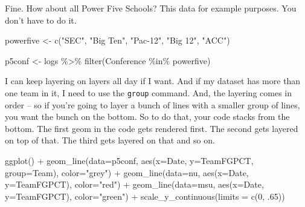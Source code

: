 \documentclass[
]{book}
\newenvironment{Shaded}{\begin{snugshade}}{\end{snugshade}}
\newcommand{\AttributeTok}[1]{\textcolor[rgb]{0.77,0.63,0.00}{#1}}
\newcommand{\DecValTok}[1]{\textcolor[rgb]{0.00,0.00,0.81}{#1}}
\newcommand{\FunctionTok}[1]{\textcolor[rgb]{0.00,0.00,0.00}{#1}}
\newcommand{\NormalTok}[1]{#1}
\newcommand{\OtherTok}[1]{\textcolor[rgb]{0.56,0.35,0.01}{#1}}
\newcommand{\SpecialCharTok}[1]{\textcolor[rgb]{0.00,0.00,0.00}{#1}}
\newcommand{\StringTok}[1]{\textcolor[rgb]{0.31,0.60,0.02}{#1}}
\begin{document}
Fine. How about all Power Five Schools? This data for example purposes. You don't have to do it.

\begin{Shaded}
\begin{Highlighting}[]
\NormalTok{powerfive }\OtherTok{\textless{}{-}} \FunctionTok{c}\NormalTok{(}\StringTok{"SEC"}\NormalTok{, }\StringTok{"Big Ten"}\NormalTok{, }\StringTok{"Pac{-}12"}\NormalTok{, }\StringTok{"Big 12"}\NormalTok{, }\StringTok{"ACC"}\NormalTok{)}

\NormalTok{p5conf }\OtherTok{\textless{}{-}}\NormalTok{ logs }\SpecialCharTok{\%\textgreater{}\%} \FunctionTok{filter}\NormalTok{(Conference }\SpecialCharTok{\%in\%}\NormalTok{ powerfive)}
\end{Highlighting}
\end{Shaded}

I can keep layering on layers all day if I want. And if my dataset has more than one team in it, I need to use the \texttt{group} command. And, the layering comes in order -- so if you're going to layer a bunch of lines with a smaller group of lines, you want the bunch on the bottom. So to do that, your code stacks from the bottom. The first geom in the code gets rendered first. The second gets layered on top of that. The third gets layered on that and so on.

\begin{Shaded}
\begin{Highlighting}[]
\FunctionTok{ggplot}\NormalTok{() }\SpecialCharTok{+} 
  \FunctionTok{geom\_line}\NormalTok{(}\AttributeTok{data=}\NormalTok{p5conf, }\FunctionTok{aes}\NormalTok{(}\AttributeTok{x=}\NormalTok{Date, }\AttributeTok{y=}\NormalTok{TeamFGPCT, }\AttributeTok{group=}\NormalTok{Team), }\AttributeTok{color=}\StringTok{"grey"}\NormalTok{) }\SpecialCharTok{+} 
  \FunctionTok{geom\_line}\NormalTok{(}\AttributeTok{data=}\NormalTok{nu, }\FunctionTok{aes}\NormalTok{(}\AttributeTok{x=}\NormalTok{Date, }\AttributeTok{y=}\NormalTok{TeamFGPCT), }\AttributeTok{color=}\StringTok{"red"}\NormalTok{) }\SpecialCharTok{+} 
  \FunctionTok{geom\_line}\NormalTok{(}\AttributeTok{data=}\NormalTok{msu, }\FunctionTok{aes}\NormalTok{(}\AttributeTok{x=}\NormalTok{Date, }\AttributeTok{y=}\NormalTok{TeamFGPCT), }\AttributeTok{color=}\StringTok{"green"}\NormalTok{) }\SpecialCharTok{+} 
  \FunctionTok{scale\_y\_continuous}\NormalTok{(}\AttributeTok{limits =} \FunctionTok{c}\NormalTok{(}\DecValTok{0}\NormalTok{, .}\DecValTok{65}\NormalTok{))}
\end{Highlighting}
\end{Shaded}
\end{document}
